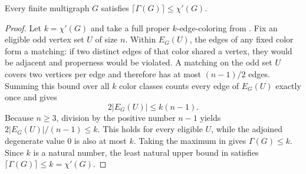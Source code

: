\begin{lemma}
Every finite multigraph $G$ satisfies
$\lceil\Gamma(G)\rceil\le\chi'(G)$.
\end{lemma}
\begin{proof}
Let $k=\chi'(G)$ and take a full proper $k$-edge-coloring from
.  Fix an eligible odd vertex set $U$ of size
$n$.  Within $E_G(U)$, the edges of any fixed color form a matching: if two
distinct edges of that color shared a vertex, they would be adjacent and
properness would be violated.  A matching on the odd set $U$ covers two
vertices per edge and therefore has at most $(n-1)/2$ edges.  Summing this
bound over all $k$ color classes counts every edge of $E_G(U)$ exactly once
and gives
\[
  2|E_G(U)|\le k(n-1).
\]
Because $n\ge3$, division by the positive number $n-1$ yields
$2|E_G(U)|/(n-1)\le k$.  This holds for every eligible $U$, while the
adjoined degenerate value $0$ is also at most $k$.  Taking the maximum in
 gives $\Gamma(G)\le k$.  Since $k$ is a natural number,
the least natural upper bound in  satisfies
$\lceil\Gamma(G)\rceil\le k=\chi'(G)$.
\end{proof}
